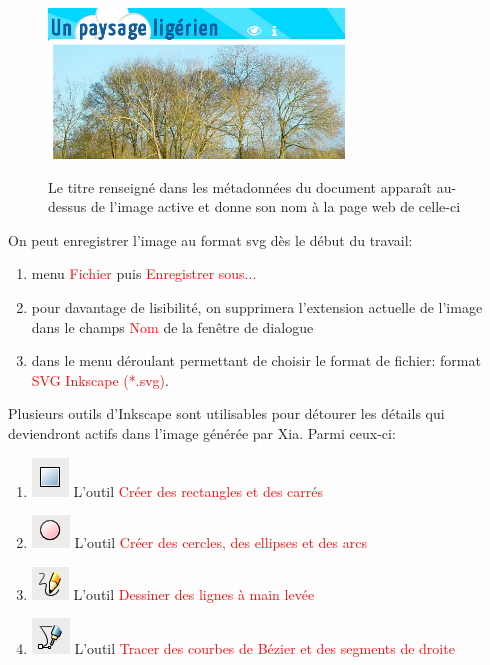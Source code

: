 \documentclass[a4paper,12pt]{report}
\newcommand{\chemin}[1]{\textcolor{red}{#1}}
\begin{document}
\begin{figure}[htp]
 \centering
 \caption{Le titre renseigné dans les métadonnées du document apparaît au-dessus de l'image active et donne son nom à la page web de celle-ci}
 \includegraphics[width=0.7\textwidth]{images/titre_ia}
 \label{titre_ia}
\end{figure}

On peut enregistrer l'image au format svg dès le début du travail:
\begin{enumerate}
 \item menu \chemin{Fichier} puis \chemin{Enregistrer sous...}
 \item pour davantage de lisibilité, on supprimera l'extension actuelle de l'image dans le champs \chemin{Nom} de la fenêtre de dialogue
 \item dans le menu déroulant permettant de choisir le format de fichier: format \chemin{SVG Inkscape (*.svg)}.
\end{enumerate}

Plusieurs outils d'Inkscape sont utilisables pour détourer les détails qui deviendront actifs dans l'image générée par Xia. Parmi ceux-ci:
\begin{enumerate}
 \item \includegraphics[scale=0.5]{./images/rec_carre} L'outil \chemin{Créer des rectangles et des carrés}
 \item \includegraphics[scale=0.5]{./images/cercles} L'outil \chemin{Créer des cercles, des ellipses et des arcs}
 \item \includegraphics[scale=0.5]{./images/lignes} L'outil \chemin{Dessiner des lignes à main levée}
 \item \includegraphics[scale=0.5]{./images/bezier} L'outil \chemin{Tracer des courbes de Bézier et des segments de droite}
\end{enumerate}
\end{document}
